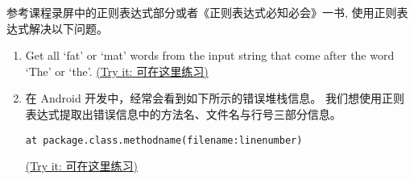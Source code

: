 \documentclass[a4paper, justified]{tufte-handout}
\begin{document}
\beginoptional
\begin{problem}[正则表达式练习]
  参考课程录屏中的正则表达式部分或者《正则表达式必知必会》一书,
  使用正则表达式解决以下问题。

  \begin{enumerate}[(1)]
    \item Get all `fat' or `mat' words from the input string
      that come after the word `The' or `the'.
      \href{https://regex101.com/r/3x5F4W/1}{(Try it: 可在这里练习)}

    \item 在 Android 开发中，经常会看到如下所示的错误堆栈信息。
      我们想使用正则表达式提取出错误信息中的方法名、文件名与行号三部分信息。

      \texttt{at package.class.methodname(filename:linenumber)}

      \href{https://regex101.com/r/YeKFVB/1}{(Try it: 可在这里练习)}

  \end{enumerate}
\end{problem}

\begin{solution}
\end{solution}
\end{document}
